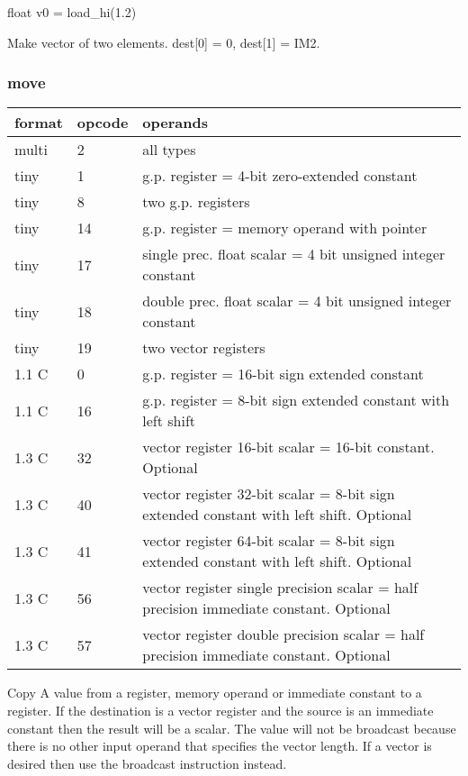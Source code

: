 \documentclass[forwardcom.tex]{subfiles}
\begin{document}
float v0 = load\_hi(1.2)
\vspace{2mm}

Make vector of two elements. dest[0] = 0, dest[1] = IM2.
\vspace{2mm}

\subsubsection{move}
\label{table:moveInstruction}
\begin{tabular}{|p{12mm}|p{12mm}|p{110mm}|}
\hline
\bfseries format & \bfseries opcode & \bfseries operands \\ \hline
multi & 2 & all types \\ \hline
tiny  & 1 & g.p. register = 4-bit zero-extended constant \\ \hline
tiny  & 8 & two g.p. registers \\ \hline
tiny  & 14 & g.p. register = memory operand with pointer \\ \hline
tiny  & 17 & single prec. float scalar = 4 bit unsigned integer constant \\ \hline
tiny  & 18 & double prec. float scalar = 4 bit unsigned integer constant \\ \hline
tiny  & 19 & two vector registers \\ \hline
1.1 C &  0 & g.p. register = 16-bit sign extended constant \\ \hline
1.1 C & 16 & g.p. register = 8-bit sign extended constant with left shift \\ \hline
1.3 C & 32 & vector register 16-bit scalar = 16-bit constant. Optional  \\ \hline
1.3 C & 40 & vector register 32-bit scalar = 8-bit sign extended constant with left shift. Optional \\ \hline
1.3 C & 41 & vector register 64-bit scalar = 8-bit sign extended constant with left shift. Optional \\ \hline
1.3 C & 56 & vector register single precision scalar = half precision immediate constant. Optional \\ \hline
1.3 C & 57 & vector register double precision scalar = half precision immediate constant. Optional \\ \hline
\end{tabular}
\vspace{2mm}

Copy A value from a register, memory operand or immediate constant to a register. If the destination is a vector register and the source is an immediate constant then the result will be a scalar. The value will not be broadcast because there is no other input operand that specifies the vector length. If a vector is desired then use the broadcast instruction instead.
\vspace{2mm}
\end{document}
